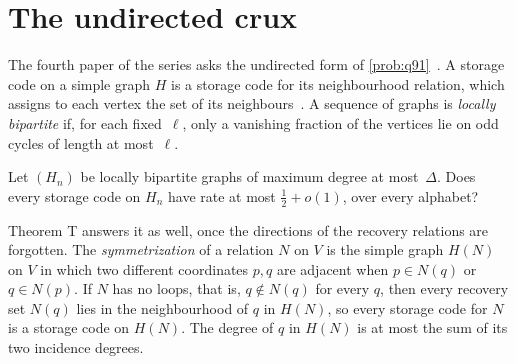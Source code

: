 \section{The undirected crux}\label{sec:undirected}

The fourth paper of the series asks the undirected form of \cref{prob:q91}~\cite[Question~6.1]{CurvedMotion2026}. A
storage code on a simple graph $H$ is a storage code for its neighbourhood relation, which assigns to each vertex the set
of its neighbours~\cite[Section~2.3]{CurvedMotion2026}. A sequence of graphs is \emph{locally bipartite} if, for each
fixed~$\ell$, only a vanishing fraction of the vertices lie on odd cycles of length at most~$\ell$.

\begin{question*}
Let $(H_n)$ be locally bipartite graphs of maximum degree at most~$\Delta$. Does every storage code on $H_n$ have rate at
most $\tfrac12+o(1)$, over every alphabet?
\end{question*}

Theorem T answers it as well, once the directions of the recovery relations are forgotten. The \emph{symmetrization} of
a relation $N$ on $V$ is the simple graph $H(N)$ on $V$ in which two different coordinates $p,q$ are adjacent when
$p\in N(q)$ or $q\in N(p)$. If $N$ has no loops, that is, $q\notin N(q)$ for every $q$, then every recovery set $N(q)$ lies
in the neighbourhood of $q$ in $H(N)$, so every storage code for $N$ is a storage code on $H(N)$. The degree of $q$ in
$H(N)$ is at most the sum of its two incidence degrees.

